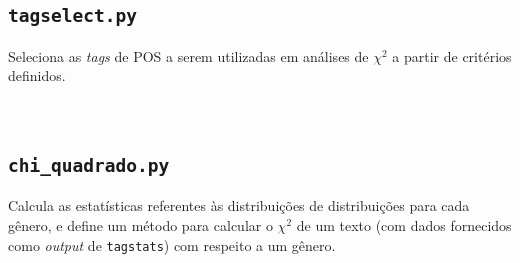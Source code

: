 \documentclass[10pt,a4paper,onecolumn]{article}
\theoremstyle{definition}
\theoremstyle{remark}
\begin{document}
\break

\subsection{\texttt{tagselect.py}}\label{ap:tagselect}
\noindent
Seleciona as \emph{tags} de POS a serem utilizadas em análises de $\chi^2$ a partir de critérios definidos.

\

\break

\subsection{\texttt{chi\_quadrado.py}}
\noindent
Calcula as estatísticas referentes às distribuições de distribuições para cada gênero, e define um método para calcular o $\chi^2$ de um texto (com dados fornecidos como \emph{output} de \texttt{tagstats}) com respeito a um gênero.

\

%
\end{document}
